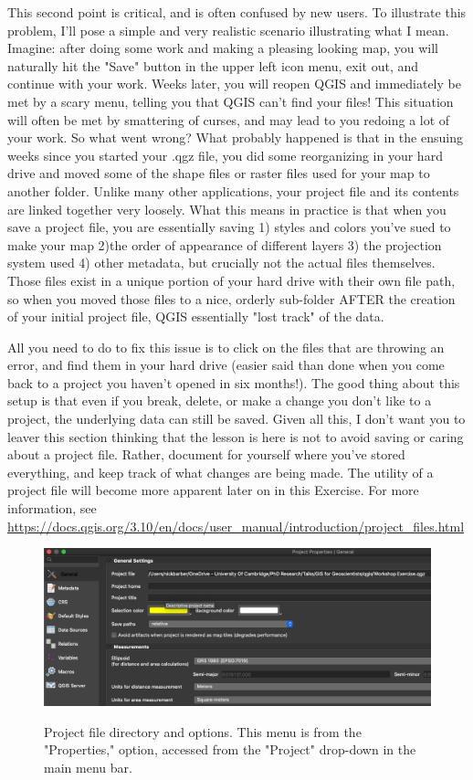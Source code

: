 \documentclass{article}
\begin{document}
This second point is critical, and is often confused by new users. To illustrate this problem, I'll pose a simple and very realistic scenario illustrating what I mean. Imagine: after doing some work and making a pleasing looking map, you will naturally hit the "Save" button in the upper left icon menu, exit out, and continue with your work. Weeks later, you will reopen QGIS and immediately be met by a scary menu, telling you that QGIS can't find your files! This situation will often be met by smattering of curses, and may lead to you redoing a lot of your work. So what went wrong? What probably happened is that in the ensuing weeks since you started your .qgz file, you did some reorganizing in your hard drive and moved some of the shape files or raster files used for your map to another folder. Unlike many other applications, your project file and its contents are linked together very loosely. What this means in practice is that when you save a project file, you are essentially saving 1) styles and colors you've sued to make your map 2)the order of appearance of different layers 3) the projection system used 4) other metadata, but crucially not the actual files themselves. Those files exist in a unique portion of your hard drive with their own file path, so when you moved those files to a nice, orderly sub-folder AFTER the creation of your initial project file, QGIS essentially "lost track" of the data. 

All you need to do to fix this issue is to click on the files that are throwing an error, and find them in your hard drive (easier said than done when you come back to a project you haven't opened in six months!). The good thing about this setup is that even if you break, delete, or make a change you don't like to a project, the underlying data can still be saved. Given all this, I don't want you to leaver this section thinking that the lesson is here is not to avoid saving or caring about a project file. Rather, document for yourself where you've stored everything, and keep track of what changes are being made. The utility of a project file will become more apparent later on in this Exercise. For more information, see \url{https://docs.qgis.org/3.10/en/docs/user_manual/introduction/project_files.html}

\begin{figure}[htbp]
    \centering
    \includegraphics[width=\textwidth]{Figure 5.png}
    \label{fig5}
    \caption{Project file directory and options. This menu is from the "Properties," option, accessed from the "Project" drop-down in the main menu bar.}
\end{figure}
\end{document}
